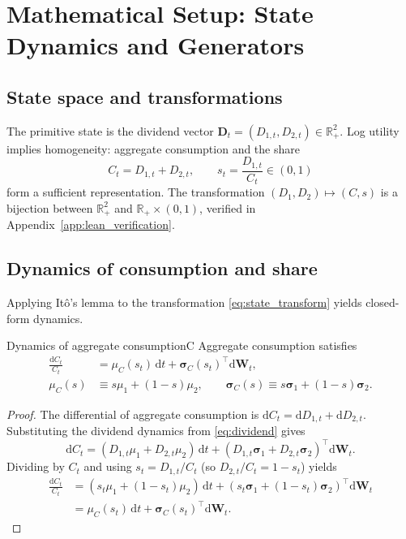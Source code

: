 ﻿\documentclass[11pt,letterpaper,oneside]{article}
\numberwithin{equation}{section}
\newcommand{\R}{\mathbb{R}}
\newcommand{\1}{\mathbf{1}}
\newcommand{\diff}{\mathrm{d}}
\begin{document}
\section{Mathematical Setup: State Dynamics and Generators}
\subsection{State space and transformations}
The primitive state is the dividend vector $\bm{D}_t=(D_{1,t},D_{2,t})\in\R_+^2$. Log utility implies homogeneity: aggregate consumption and the share
\begin{equation}\label{eq:state_transform}
  C_t=D_{1,t}+D_{2,t}, \qquad s_t=\frac{D_{1,t}}{C_t}\in(0,1)
\end{equation}
form a sufficient representation. The transformation $(D_1,D_2)\mapsto(C,s)$ is a bijection between $\R_+^2$ and $\R_+\times(0,1)$, verified in Appendix~\ref{app:lean_verification}.

\subsection{Dynamics of consumption and share}
Applying It\^o's lemma to the transformation \eqref{eq:state_transform} yields closed-form dynamics.

\begin{lemma}{Dynamics of aggregate consumption}{C}
Aggregate consumption satisfies
\begin{align}
  \frac{\diff C_t}{C_t}
  &= \mu_C(s_t)\,\diff t + \bm{\sigma}_C(s_t)^{\top}\diff \bm{W}_t,
  \label{eq:C_drift}\\
  \mu_C(s) &\equiv s\mu_1+(1-s)\mu_2,
  \qquad
  \bm{\sigma}_C(s) \equiv s\bm{\sigma}_1+(1-s)\bm{\sigma}_2.
  \label{eq:sigmaC_def}
\end{align}
\end{lemma}
\begin{proof}
The differential of aggregate consumption is \mbox{$\diff C_t = \diff D_{1,t}+\diff D_{2,t}$}. Substituting the dividend dynamics from \cref{eq:dividend} gives
\[
  \diff C_t = (D_{1,t}\mu_1+D_{2,t}\mu_2)\,\diff t + (D_{1,t}\bm{\sigma}_1+D_{2,t}\bm{\sigma}_2)^{\top}\diff\bm{W}_t.
\]
Dividing by $C_t$ and using $s_t=D_{1,t}/C_t$ (so $D_{2,t}/C_t=1-s_t$) yields
\begin{align*}
  \frac{\diff C_t}{C_t}
  &= (s_t\mu_1+(1-s_t)\mu_2)\,\diff t + (s_t\bm{\sigma}_1+(1-s_t)\bm{\sigma}_2)^{\top}\diff\bm{W}_t \\
  &= \mu_C(s_t)\,\diff t + \bm{\sigma}_C(s_t)^{\top}\diff\bm{W}_t.
\end{align*}
\end{proof}
\end{document}
